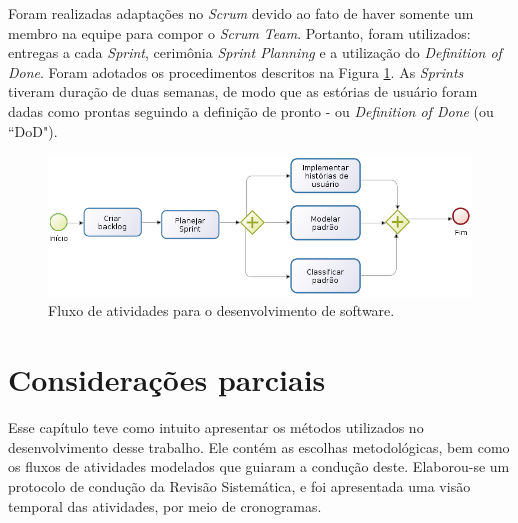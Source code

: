 Foram realizadas adaptações no \textit{Scrum} devido ao fato de haver somente um membro na equipe para compor o \textit{Scrum Team}. Portanto, foram utilizados: entregas a cada \textit{Sprint}, cerimônia \textit{Sprint Planning} e a utilização do \textit{Definition of Done}.
Foram adotados os procedimentos descritos na Figura \ref{fig:proc_desenv}. As \textit{Sprints} tiveram duração de duas semanas, de modo que as estórias de usuário foram dadas como prontas seguindo a definição de pronto - ou \textit{Definition of Done} (ou ``DoD"). 

\newpage
\begin{figure}[!htb]
    \centering
    \includegraphics[scale=0.5]{figuras/processo_desenvolvimento.png}
    \caption{Fluxo de atividades para o desenvolvimento de software.} 
    \label{fig:proc_desenv}
\end{figure}





\section{Considerações parciais}

Esse capítulo teve como intuito apresentar os métodos utilizados no desenvolvimento desse trabalho. Ele contém as escolhas metodológicas, bem como os fluxos de atividades modelados que guiaram a condução deste. Elaborou-se um protocolo de condução da Revisão Sistemática, e foi apresentada uma visão temporal das atividades, por meio de cronogramas.